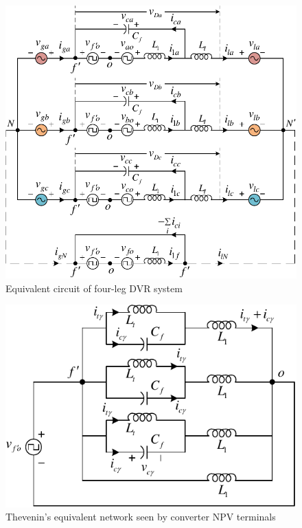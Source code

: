 \begin{figure}[h!]   
	\centering
	\includegraphics[scale=1]{figures/Chapter_5/Mine/DVR_equ.pdf}
	\caption{Equivalent circuit of four-leg DVR system} %
	\label{5.DVR_equ}
\end{figure} 
\begin{figure}[t!]
	\centering
	\includegraphics[scale=1]{figures/Chapter_5/Mine/CMV_Thevenins.pdf} %
	\caption{Thevenin's equivalent network seen by converter NPV terminals }
	\label{5.APF_equ}
\end{figure}

